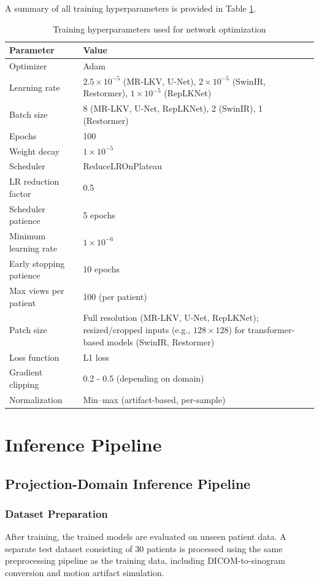 A summary of all training hyperparameters is provided in Table \ref{tab:training_params}. 

\begin{table}[H]
\centering
\caption{Training hyperparameters used for network optimization}
\label{tab:training_params}
\renewcommand{\arraystretch}{1.2}
\begin{tabular}{p{5cm} p{9cm}}
\toprule
\textbf{Parameter} & \textbf{Value} \\
\midrule
Optimizer & Adam \\
Learning rate & $2.5 \times 10^{-5}$ (MR-LKV, U-Net), $2 \times 10^{-5}$ (SwinIR, Restormer), $1 \times 10^{-5}$ (RepLKNet)\\
Batch size & 8 (MR-LKV, U-Net, RepLKNet), 2 (SwinIR), 1 (Restormer)\\
Epochs & 100 \\
Weight decay & $1 \times 10^{-5}$ \\
Scheduler & ReduceLROnPlateau\\
LR reduction factor & 0.5 \\
Scheduler patience & 5 epochs \\
Minimum learning rate & $1 \times 10^{-6}$ \\
Early stopping patience & 10 epochs \\
Max views per patient & 100 (per patient)\\
Patch size & Full resolution (MR-LKV, U-Net, RepLKNet); resized/cropped inputs (e.g., $128 \times 128$) for transformer-based models (SwinIR, Restormer)\\
Loss function & L1 loss \\
Gradient clipping & 0.2 - 0.5 (depending on domain)\\
Normalization & Min--max (artifact-based, per-sample)\\
\bottomrule
\end{tabular}
\end{table}



\section{Inference Pipeline}

\subsection{Projection-Domain Inference Pipeline}
\subsubsection{Dataset Preparation}
After training, the trained models are evaluated on unseen patient data. A separate test dataset consisting of 30 patients is processed using the same preprocessing pipeline as the training data, including DICOM-to-sinogram conversion and motion artifact simulation. 

